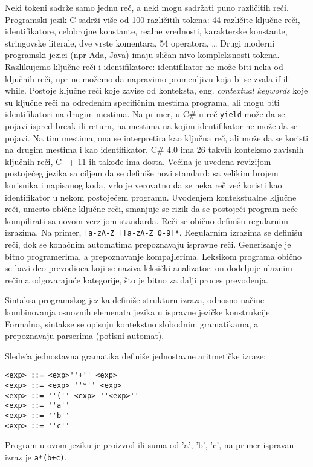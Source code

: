 \documentclass[../main.tex]{subfiles}
\begin{document}
Neki tokeni sadrže samo jednu reč, a neki mogu sadržati puno različitih reči. Programski jezik C sadrži više od 100 različitih tokena: 44 različite ključne reči, identifikatore, celobrojne konstante, realne vrednosti, karakterske konstante, stringovske literale, dve vrste komentara, 54 operatora, \ldots
Drugi moderni programski jezici (npr Ada, Java) imaju sličan nivo kompleksnosti tokena.
\\
Razlikujemo ključne reči i identifikatore: identifikator ne može biti neka od ključnih reči, npr ne možemo da napravimo promenljivu koja bi se zvala if ili while. Postoje ključne reči koje zavise od konteksta, eng. {\it contextual keywords} koje su ključne reči na određenim specifičnim mestima programa, ali mogu biti identifikatori na drugim mestima. Na primer, u C\#-u reč \texttt{yield} može da se pojavi ispred break ili return, na mestima na kojim identifikator ne može da se pojavi. Na tim mestima, ona se interpretira kao ključna reč, ali može da se koristi na drugim mestima i kao identifikator. C\# 4.0 ima 26 takvih konteksno zavisnih ključnih reči, C++ 11 ih takođe ima dosta. Većina je uvedena revizijom postojećeg jezika sa ciljem da se definiše novi standard: sa velikim brojem korisnika i napisanog koda, vrlo je verovatno da se neka reč već koristi kao identifikator u nekom postojećem programu. Uvođenjem kontekstualne ključne reči, umesto obične ključne reči, smanjuje se rizik da se postojeći program neće kompilirati sa novom verzijom standarda. Reči se obično definišu regularnim izrazima. Na primer, \texttt{[a-zA-Z\_][a-zA-Z\_0-9]*}. Regularnim izrazima se definišu reči, dok se konačnim automatima prepoznavaju ispravne reči. Generisanje je bitno programerima, a prepoznavanje kompajlerima. Leksikom programa obično se bavi deo prevodioca koji se naziva leksički analizator: on dodeljuje ulaznim rečima odgovarajuće kategorije, što je bitno za dalji proces prevođenja.


Sintaksa programskog jezika definiše strukturu izraza, odnosno načine kombinovanja osnovnih elemenata jezika u ispravne jezičke konstrukcije. Formalno, sintakse se opisuju kontekstno slobodnim gramatikama, a prepoznavaju parserima (potisni automat). 

\begin{boxprimer}
Sledeća jednostavna gramatika definiše jednostavne aritmetičke izraze:
\begin{Verbatim}
<exp> ::= <exp>''+'' <exp>
<exp> ::= <exp> ''*'' <exp>
<exp> ::= ''('' <exp> ''<exp>''
<exp> ::= ''a''
<exp> ::= ''b''
<exp> ::= ''c''
\end{Verbatim}
Program u ovom jeziku je proizvod ili suma od 'a', 'b', 'c', na primer ispravan izraz je \texttt{a*(b+c)}.
\end{boxprimer}
\end{document}
